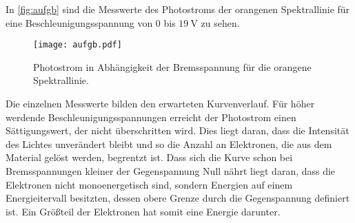 \newpage
\noindent
In \autoref{fig:aufgb} sind die Messwerte des Photostroms der orangenen Spektrallinie für eine Beschleunigungsspannung von $0$ bis $\SI{19}{\volt}$ zu sehen.
\begin{figure}[H]
  \centering
  \texttt{[image: aufgb.pdf]}
  \caption{Photostrom in Abhängigkeit der Bremsspannung für die orangene Spektrallinie.}
  \label{fig:aufgb}
\end{figure}
\noindent
Die einzelnen Messwerte bilden den erwarteten Kurvenverlauf. Für höher werdende Beschleunigungsspannungen erreicht der Photostrom einen Sättigungswert, der nicht überschritten wird.
Dies liegt daran, dass die Intensität des Lichtes unverändert bleibt und so die Anzahl an Elektronen, die aus dem Material gelöst werden, begrentzt ist.
\newline
Dass sich die Kurve schon bei Bremsspannungen kleiner der Gegenspannung Null nährt liegt daran, dass die Elektronen nicht monoenergetisch sind, sondern Energien auf einem
Energieitervall besitzten, dessen obere Grenze durch die Gegenspannung definiert ist. Ein Größteil der Elektronen hat somit eine Energie darunter.
